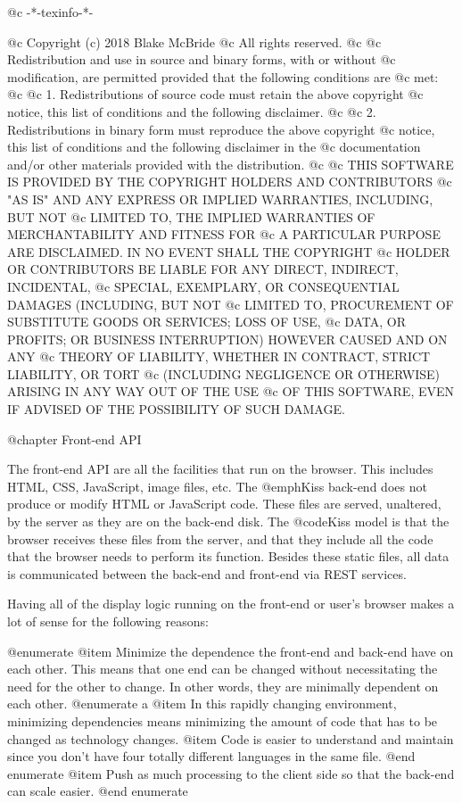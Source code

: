 @c -*-texinfo-*-

@c  Copyright (c) 2018 Blake McBride
@c  All rights reserved.
@c
@c  Redistribution and use in source and binary forms, with or without
@c  modification, are permitted provided that the following conditions are
@c  met:
@c
@c  1. Redistributions of source code must retain the above copyright
@c  notice, this list of conditions and the following disclaimer.
@c
@c  2. Redistributions in binary form must reproduce the above copyright
@c  notice, this list of conditions and the following disclaimer in the
@c  documentation and/or other materials provided with the distribution.
@c
@c  THIS SOFTWARE IS PROVIDED BY THE COPYRIGHT HOLDERS AND CONTRIBUTORS
@c  "AS IS" AND ANY EXPRESS OR IMPLIED WARRANTIES, INCLUDING, BUT NOT
@c  LIMITED TO, THE IMPLIED WARRANTIES OF MERCHANTABILITY AND FITNESS FOR
@c  A PARTICULAR PURPOSE ARE DISCLAIMED. IN NO EVENT SHALL THE COPYRIGHT
@c  HOLDER OR CONTRIBUTORS BE LIABLE FOR ANY DIRECT, INDIRECT, INCIDENTAL,
@c  SPECIAL, EXEMPLARY, OR CONSEQUENTIAL DAMAGES (INCLUDING, BUT NOT
@c  LIMITED TO, PROCUREMENT OF SUBSTITUTE GOODS OR SERVICES; LOSS OF USE,
@c  DATA, OR PROFITS; OR BUSINESS INTERRUPTION) HOWEVER CAUSED AND ON ANY
@c  THEORY OF LIABILITY, WHETHER IN CONTRACT, STRICT LIABILITY, OR TORT
@c  (INCLUDING NEGLIGENCE OR OTHERWISE) ARISING IN ANY WAY OUT OF THE USE
@c  OF THIS SOFTWARE, EVEN IF ADVISED OF THE POSSIBILITY OF SUCH DAMAGE.


@chapter Front-end API

The front-end API are all the facilities that run on the browser.
This includes HTML, CSS, JavaScript, image files, etc.  The @emph{Kiss}
back-end does not produce or modify HTML or JavaScript code.  These
files are served, unaltered, by the server as they are on the back-end
disk.  The @code{Kiss} model is that the browser receives these files
from the server, and that they include all the code that the browser
needs to perform its function.  Besides these static files, all data
is communicated between the back-end and front-end via REST services.

Having all of the display logic running on the front-end or user's
browser makes a lot of sense for the following reasons:

@enumerate
@item
Minimize the dependence the front-end and back-end have on each other.  This means that one end can be changed without necessitating
the need for the other to change.  In other words, they are minimally dependent on each other.
@enumerate a
@item
In this rapidly changing environment, minimizing dependencies means minimizing the amount of code that has to be changed as technology changes.
@item
Code is easier to understand and maintain since you don't have four totally different languages in the same file.
@end enumerate
@item
Push as much processing to the client side so that the back-end can scale easier.
@end enumerate

